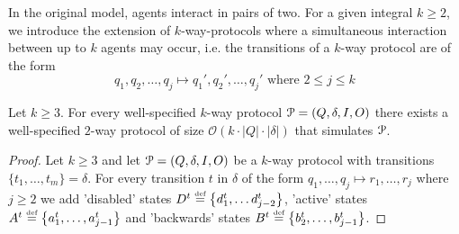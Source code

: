 In the original model, agents interact in pairs of two. 
For a given integral $k\geq 2$, we introduce the extension of 
$k$-way-protocols where a simultaneous interaction between up to $k$ agents 
may occur, i.e. the transitions of a $k$-way protocol are of the form
$$q_1, q_2, \ldots, q_j \mapsto q_1', q_2', \ldots, q_j' 
  \text{ where } 2 \leq j \leq k$$
\begin{lemma}
	Let $k \geq 3$.
	For every well-specified $k$-way protocol $\mathcal{P}= (Q, \delta, I, O)$ 
	there exists a well-specified $2$-way protocol of size 
	$\mathcal{O}(k \cdot |Q| \cdot |\delta|)$ that simulates $\mathcal{P}$.
\end{lemma}
\begin{proof}
	Let $k \geq 3$ and let $\mathcal{P} = (Q, \delta, I, O)$ be a $k$-way protocol with 
	transitions $\{t_1, \ldots, t_m\} = \delta$. 
	For every transition $t$ in $\delta$ of the form 
	$q_1, \ldots, q_j \mapsto r_1, \ldots, r_j$ where $j \geq 2$ 
	we add 'disabled' states $D^t \stackrel{\scriptscriptstyle\text{def}}{=} \left\{d^t_{1}, \ldots d^t_{{j-2}}\right\}$, 
	'active' states $A^t \stackrel{\scriptscriptstyle\text{def}}{=} \left\{a^t_{1}, \ldots, a^t_{{j-1}}\right\}$ and 
	'backwards' states $B^t \stackrel{\scriptscriptstyle\text{def}}{=} \left\{b^t_{2}, \ldots, b^t_{j-1}\right\}$.


\end{proof}

